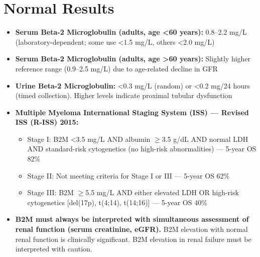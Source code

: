 \section*{Normal Results}
\begin{itemize}
  \item \textbf{Serum Beta-2 Microglobulin (adults, age <60 years):} 0.8--2.2 mg/L (laboratory-dependent; some use <1.5 mg/L, others <2.0 mg/L)
  \item \textbf{Serum Beta-2 Microglobulin (adults, age >60 years):} Slightly higher reference range (0.9--2.5 mg/L) due to age-related decline in GFR
  \item \textbf{Urine Beta-2 Microglobulin:} <0.3 mg/L (random) or <0.2 mg/24 hours (timed collection). Higher levels indicate proximal tubular dysfunction
  \item \textbf{Multiple Myeloma International Staging System (ISS) --- Revised ISS (R-ISS) 2015:}
  \begin{itemize}
    \item Stage I: B2M <3.5 mg/L AND albumin $\geq$3.5 g/dL AND normal LDH AND standard-risk cytogenetics (no high-risk abnormalities) --- 5-year OS 82\%
    \item Stage II: Not meeting criteria for Stage I or III --- 5-year OS 62\%
    \item Stage III: B2M $\geq$5.5 mg/L AND either elevated LDH OR high-risk cytogenetics [del(17p), t(4;14), t(14;16)] --- 5-year OS 40\%
  \end{itemize}
  \item \textbf{B2M must always be interpreted with simultaneous assessment of renal function (serum creatinine, eGFR).} B2M elevation with normal renal function is clinically significant. B2M elevation in renal failure must be interpreted with caution.
\end{itemize}

